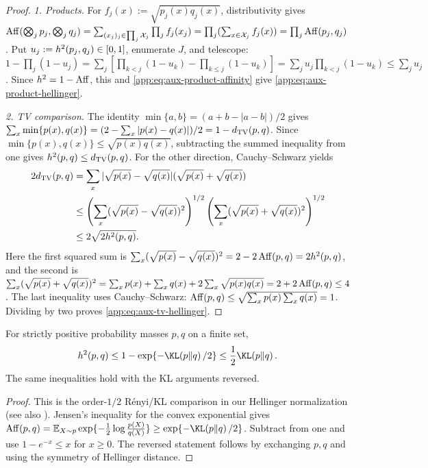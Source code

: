 \begin{proof}\color{red}
\emph{1. Products.}
For $f_j(x):=\sqrt{p_j(x)q_j(x)}$, distributivity gives
$\operatorname{Aff}(\bigotimes_jp_j,\bigotimes_jq_j)
=\sum_{(x_j)_j\in\prod_j\mathcal X_j}\prod_j f_j(x_j)
=\prod_j(\sum_{x\in\mathcal X_j}f_j(x))
=\prod_j\operatorname{Aff}(p_j,q_j)$.
Put $u_j:=h^2(p_j,q_j)\in[0,1]$, enumerate $J$, and telescope:
$1-\prod_j(1-u_j)
=\sum_j[\prod_{k<j}(1-u_k)-\prod_{k\le j}(1-u_k)]
=\sum_j u_j\prod_{k<j}(1-u_k)\le\sum_j u_j$.
Since $h^2=1-\operatorname{Aff}$, this and
\eqref{app:eq:aux-product-affinity} give \eqref{app:eq:aux-product-hellinger}.

\emph{2. TV comparison.}
The identity $\min\{a,b\}=(a+b-|a-b|)/2$ gives
$\sum_x\min\{p(x),q(x)\}
=(2-\sum_x|p(x)-q(x)|)/2=1-d_{\mathrm{TV}}(p,q)$.
Since \(\min\{p(x),q(x)\}\le\sqrt{p(x)q(x)}\), subtracting the summed
inequality from one gives
\(h^2(p,q)\le d_{\mathrm{TV}}(p,q)\).  For the other direction,
Cauchy--Schwarz yields
\begin{align*}
 2d_{\mathrm{TV}}(p,q)
 &=\sum_x|\sqrt{p(x)}-\sqrt{q(x)}|
          (\sqrt{p(x)}+\sqrt{q(x)})\\
 &\le
 \left(\sum_x(\sqrt{p(x)}-\sqrt{q(x)})^2\right)^{1/2}
 \left(\sum_x(\sqrt{p(x)}+\sqrt{q(x)})^2\right)^{1/2}\\
 &\le 2\sqrt{2h^2(p,q)}.
\end{align*}
Here the first squared sum is
$\sum_x(\sqrt{p(x)}-\sqrt{q(x)})^2
=2-2\operatorname{Aff}(p,q)=2h^2(p,q)$, and the second is
$\sum_x(\sqrt{p(x)}+\sqrt{q(x)})^2
=\sum_xp(x)+\sum_xq(x)+2\sum_x\sqrt{p(x)q(x)}
=2+2\operatorname{Aff}(p,q)\le4$.
The last inequality uses Cauchy--Schwarz:
$\operatorname{Aff}(p,q)\le\sqrt{\sum_xp(x)\sum_xq(x)}=1$.
Dividing by two proves \eqref{app:eq:aux-tv-hellinger}.
\end{proof}

\begin{lemma}
\label{app:lem:kl-hellinger}
For strictly positive probability masses $p,q$ on a finite set,
\begin{equation}
 \sqHellinger(p,q)
 \le 1-\exp\{-\KLDivergence{p}{q}/2\}
 \le\frac12\KLDivergence{p}{q}.
 \label{app:eq:aux-kl-hellinger}
\end{equation}
The same inequalities hold with the KL arguments reversed.
\end{lemma}

\begin{proof}\color{red}
This is the order-$1/2$ R\'enyi/KL comparison in our Hellinger
normalization (see also \citealp{vanerven2014renyi}).
Jensen's inequality for the convex exponential gives
$\HellingerAffinity(p,q)
=\mathbb E_{X\sim p}\exp\{-\tfrac12\log\frac{p(X)}{q(X)}\}
\ge\exp\{-\KLDivergence{p}{q}/2\}$.
Subtract from one and use $1-e^{-x}\le x$ for $x\ge0$.
The reversed statement follows by exchanging $p,q$ and using the symmetry
of Hellinger distance.
\end{proof}

